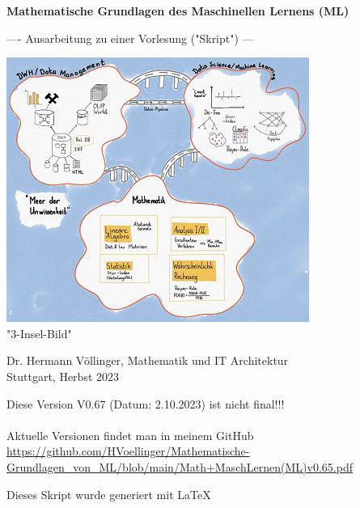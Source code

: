 \documentclass[12pt]{article}
\begin{document}

\begin{titlepage}
   \begin{center}
   \LARGE  
   \vspace{1.0cm}
       
   \textbf{Mathematische Grundlagen des Maschinellen Lernens (ML)}

   \vspace{1.0cm}
  
   \large       
   ---- Ausarbeitung zu einer Vorlesung ("Skript") ---
       
   
   \vspace{1.0cm}
   
   \includegraphics{DWH-Zeichnung}\\
   \small "3-Insel-Bild"  
       
   \vfill
   \large   
   
   Dr. Hermann Völlinger, Mathematik und IT Architektur
           \\ Stuttgart, Herbst 2023     

   \vspace{0.6cm}
        
   \end{center}
   
\begin{center}
Diese Version V0.67 (Datum: 2.10.2023) ist nicht final!!! \\
{\color{red}{(Beachte: ************ Kommentare *********)}} \\[0.3cm]
Aktuelle Versionen findet man in meinem GitHub\\[0.1cm]
\url{https://github.com/HVoellinger/Mathematische-Grundlagen_von_ML/blob/main/Math+MaschLernen(ML)v0.65.pdf} \\
\vspace{0.4cm}
\begin{large}
Dieses Skript wurde generiert mit \LaTeX\  
\end{large}
\end{center}


\end{titlepage}
\end{document}
